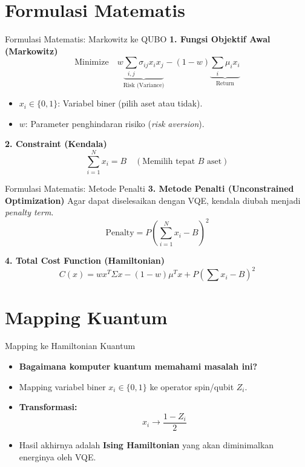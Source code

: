 \documentclass{beamer}
\begin{document}
\section{Formulasi Matematis}
\begin{frame}{Formulasi Matematis: Markowitz ke QUBO}
    \textbf{1. Fungsi Objektif Awal (Markowitz)}
    \begin{equation*}
        \text{Minimize} \quad w \underbrace{\sum_{i,j} \sigma_{ij} x_i x_j}_{\text{Risk (Variance)}} - (1-w) \underbrace{\sum_i \mu_i x_i}_{\text{Return}}
    \end{equation*}
    \begin{itemize}
        	\item $x_i \in \{0, 1\}$: Variabel biner (pilih aset atau tidak).
        	\item $w$: Parameter penghindaran risiko (\textit{risk aversion}).
    \end{itemize}

    \textbf{2. Constraint (Kendala)}
    \begin{equation*}
        \sum_{i=1}^N x_i = B \quad (\text{Memilih tepat } B \text{ aset})
    \end{equation*}
\end{frame}

\begin{frame}{Formulasi Matematis: Metode Penalti}
    \textbf{3. Metode Penalti (Unconstrained Optimization)}
    Agar dapat diselesaikan dengan VQE, kendala diubah menjadi \textit{penalty term}.
    \begin{equation*}
        \text{Penalty} = P \left( \sum_{i=1}^N x_i - B \right)^2
    \end{equation*}
    
    \textbf{4. Total Cost Function (Hamiltonian)}
    \begin{equation*}
        C(x) = w x^T \Sigma x - (1-w) \mu^T x + P \left( \sum x_i - B \right)^2
    \end{equation*}
\end{frame}

\section{Mapping Kuantum}
\begin{frame}{Mapping ke Hamiltonian Kuantum}
    \begin{itemize}
        	\item \textbf{Bagaimana komputer kuantum memahami masalah ini?}
        \item Mapping variabel biner $x_i \in \{0, 1\}$ ke operator spin/qubit $Z_i$.
        \item \textbf{Transformasi:}
        \begin{equation*}
            x_i \rightarrow \frac{1-Z_i}{2}
        \end{equation*}
        \item Hasil akhirnya adalah \textbf{Ising Hamiltonian} yang akan diminimalkan energinya oleh VQE.
    \end{itemize}
\end{frame}
\end{document}
